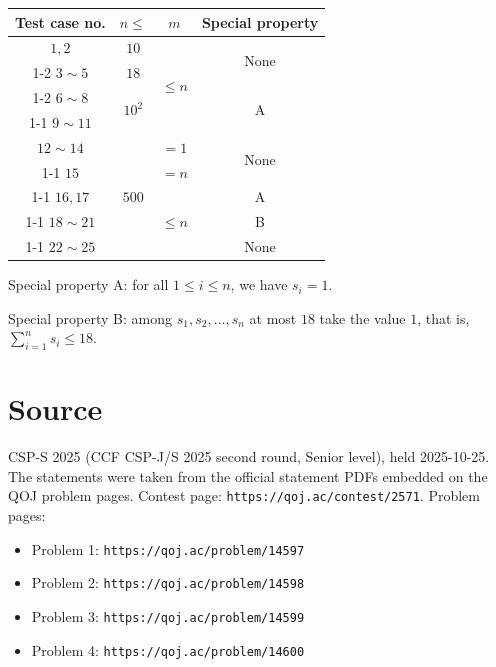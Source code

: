\documentclass[11pt]{article}
\begin{document}
\begin{center}
\begin{tabular}{|c|c|c|c|}
\hline
Test case no. & $n \le$ & $m$ & Special property \\
\hline
$1, 2$ & $10$ & \multirow{4}{*}{$\le n$} & \multirow{2}{*}{None} \\
\cline{1-2}
$3 \sim 5$ & $18$ & & \\
\cline{1-2}\cline{4-4}
$6 \sim 8$ & \multirow{2}{*}{$10^2$} & & \multirow{2}{*}{A} \\
\cline{1-1}
$9 \sim 11$ & & & \\
\hline
$12 \sim 14$ & \multirow{5}{*}{$500$} & $= 1$ & \multirow{2}{*}{None} \\
\cline{1-1}\cline{3-3}
$15$ & & $= n$ & \\
\cline{1-1}\cline{3-4}
$16, 17$ & & \multirow{3}{*}{$\le n$} & A \\
\cline{1-1}\cline{4-4}
$18 \sim 21$ & & & B \\
\cline{1-1}\cline{4-4}
$22 \sim 25$ & & & None \\
\hline
\end{tabular}
\end{center}

Special property A: for all $1 \le i \le n$, we have $s_i = 1$.

Special property B: among $s_1, s_2, \dots, s_n$ at most $18$ take the
value $1$, that is, $\sum_{i=1}^{n} s_i \le 18$.

\section*{Source}

CSP-S 2025 (CCF CSP-J/S 2025 second round, Senior level), held 2025-10-25.
The statements were taken from the official statement PDFs embedded on the
QOJ problem pages.
Contest page: \texttt{https://qoj.ac/contest/2571}.
Problem pages:
\begin{itemize}
\item Problem 1: \texttt{https://qoj.ac/problem/14597}
\item Problem 2: \texttt{https://qoj.ac/problem/14598}
\item Problem 3: \texttt{https://qoj.ac/problem/14599}
\item Problem 4: \texttt{https://qoj.ac/problem/14600}
\end{itemize}
\end{document}
